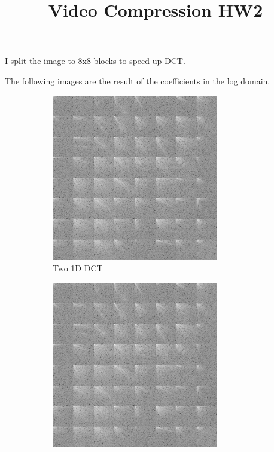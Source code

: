 \documentclass{homework}
\begin{document}
\title{Video Compression HW2}
\author{\chineseName \masterStudentID}
\date{}
\maketitle

I split the image to 8x8 blocks to speed up DCT.

The following images are the result of the coefficients in the log domain.

\begin{figure}[H]
    \centering
    \begin{subfigure}{0.32\textwidth}
        \centering
        \includegraphics[width=0.8\textwidth]{dct_1d.png}
        \caption{Two 1D DCT}
    \end{subfigure}
    \begin{subfigure}{0.32\textwidth}
        \centering
        \includegraphics[width=0.8\textwidth]{dct_2d.png}

\end{subfigure}
\end{figure}
\end{document}
